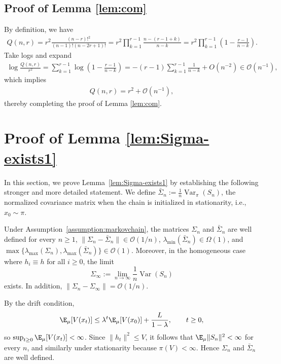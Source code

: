 \documentclass[mnsc,nonblindrev]{informs3}
\begin{document}
\subsection{Proof of Lemma \ref{lem:com}}\label{sec:com}
By definition, we have
\begin{align*}
Q(n, r)=r^2 \frac{(n-r)!^2}{(n-1)!(n-2 r+1)!}=r^2 \prod_{k=1}^{r-1} \frac{n-(r-1+k)}{n-k}=r^2 \prod_{k=1}^{r-1}\left(1-\frac{r-1}{n-k}\right) .
\end{align*}
Take logs and expand
\begin{align*}
\log \frac{Q(n, r)}{r^2}=\sum_{k=1}^{r-1} \log \left(1-\frac{r-1}{n-k}\right)=-(r-1) \sum_{k=1}^{r-1} \frac{1}{n-k}+O(n^{-2}) \in \mathcal{O}(n^{-1}),
\end{align*}
which implies
\begin{align*}
Q(n, r) = r^2 + \mathcal{O}(n^{-1}),
\end{align*}
thereby completing the proof of Lemma \ref{lem:com}.
\section{Proof of Lemma \ref{lem:Sigma-exists1}}\label{sec:proof-Sigma-exists}
In this section, we prove Lemma~\ref{lem:Sigma-exists1} by establishing the following
stronger and more detailed statement. We define $\bar \Sigma_n:= \frac{1}{n}\operatorname{Var}_{\pi}(S_n)$, the normalized covariance matrix  when the chain is initialized in
stationarity, i.e., $x_0\sim\pi$. 
\begin{lemma}
\label{lem:Sigma-exists}
Under Assumption~\ref{assumption:markovchain}, the matrices $\Sigma_n$ and $\bar \Sigma_n$ are well defined for every $n\ge 1$, $\|\Sigma_n-\bar \Sigma_n\| \in \mathcal O(1/n)$, $\lambda_{\min}(\bar \Sigma_n) \in \Omega(1)$, and $\max\{\lambda_{\max}(\Sigma_n),\lambda_{\max}(\bar \Sigma_n)\} \in \mathcal O(1)$. Moreover, in the homogeneous case where
$h_i\equiv h$ for all $i\ge 0$, the limit
\[
\Sigma_\infty:= \lim_{n\to\infty}\frac{1}{n}\operatorname{Var}(S_n)
\]
exists. In addition, $\|\Sigma_n-\Sigma_\infty\|=\mathcal O(1/n)$.
\end{lemma}


By the drift condition,
\[
\E_\mu[V(x_t)] \le \lambda^t \E_\mu[V(x_0)] + \frac{L}{1-\lambda},
\qquad t\ge 0,
\]
so \(\sup_{t\ge 0}\E_\mu[V(x_t)]<\infty\). Since \(\|h_t\|^2\le V\), it follows that
\(\E_\mu\|S_n\|^2<\infty\) for every \(n\), and similarly under stationarity because
\(\pi(V)<\infty\). Hence \(\Sigma_n\) and \(\bar\Sigma_n\) are well defined.
\end{document}
